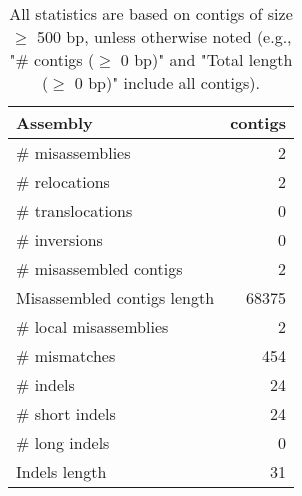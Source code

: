 \documentclass[12pt,a4paper]{article}
\begin{document}
\begin{table}[ht]
\begin{center}
\caption{All statistics are based on contigs of size $\geq$ 500 bp, unless otherwise noted (e.g., "\# contigs ($\geq$ 0 bp)" and "Total length ($\geq$ 0 bp)" include all contigs).}
\begin{tabular}{|l*{1}{|r}|}
\hline
Assembly & contigs \\ \hline
\# misassemblies & 2 \\ \hline
\hspace{5mm}\# relocations & 2 \\ \hline
\hspace{5mm}\# translocations & 0 \\ \hline
\hspace{5mm}\# inversions & 0 \\ \hline
\# misassembled contigs & 2 \\ \hline
Misassembled contigs length & 68375 \\ \hline
\# local misassemblies & 2 \\ \hline
\# mismatches & 454 \\ \hline
\# indels & 24 \\ \hline
\hspace{5mm}\# short indels & 24 \\ \hline
\hspace{5mm}\# long indels & 0 \\ \hline
Indels length & 31 \\ \hline
\end{tabular}
\end{center}
\end{table}
\end{document}
